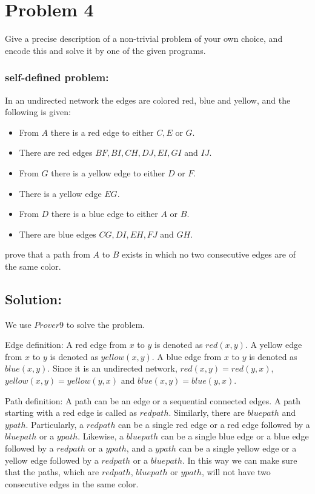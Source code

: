 \section*{Problem 4}

Give a precise description of a non-trivial problem of your own choice, and encode this and solve it by one of the given programs.

\subsubsection*{self-defined problem:}

In an undirected network the edges are colored red, blue and yellow, and the following is given:

\begin{itemize}
  \item From $A$ there is a red edge to either $C, E$ or $G$.
  \item There are red edges $BF, BI, CH, DJ, EI, GI$ and $IJ$.
  \item From $G$ there is a yellow edge to either $D$ or $F$.
  \item There is a yellow edge $EG$.
  \item From $D$ there is a blue edge to either $A$ or $B$.
  \item There are blue edges $CG, DI, EH, FJ$ and $GH$.
\end{itemize}
prove that a path from $A$ to $B$ exists in which no two consecutive edges
are of the same color.

\vspace{4mm}

\subsection*{Solution:}

We use $Prover9$ to solve the problem.

Edge definition: A red edge from $x$ to $y$ is denoted as $red(x,y)$. A yellow edge from $x$ to $y$ is denoted as $yellow(x,y)$. A blue edge from $x$ to $y$ is denoted as $blue(x,y)$. Since it is an undirected network, $red(x,y) = red(y,x)$, $yellow(x,y) = yellow(y,x)$ and $blue(x,y) = blue(y,x)$.

Path definition: A path can be an edge or a sequential connected edges. A path starting with a red edge is called as $redpath$. Similarly, there are $bluepath$ and $ypath$. Particularly, a $redpath$ can be a single red edge or a red edge followed by a $bluepath$ or a $ypath$. Likewise, a $bluepath$ can be a single blue edge or a blue edge followed by a $redpath$ or a $ypath$, and a $ypath$ can be a single yellow edge or a yellow edge followed by a $redpath$ or a $bluepath$. In this way we can make sure that the paths, which are $redpath$, $bluepath$ or $ypath$, will not have two consecutive edges in the same color.


